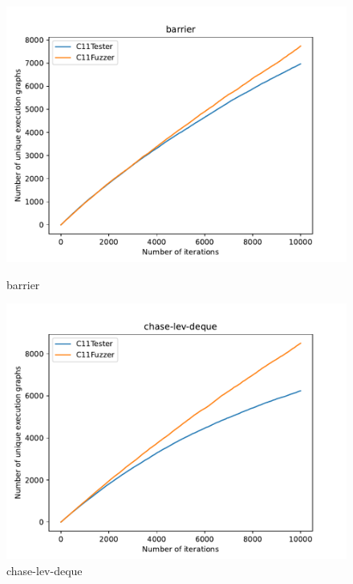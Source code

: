 \begin{figure}[H]

	\centering
	\begin{minipage}{0.45\textwidth}
		\centering
		\includegraphics[width=\textwidth]{figure/barrier.pdf}
		\caption{barrier}
		\label{cover-plot1-barrier}
	\end{minipage}
	\hfill
	\begin{minipage}{0.45\textwidth}
		\centering
		\includegraphics[width=\textwidth]{figure/chase-lev-deque.pdf}
		\caption{chase-lev-deque}
		\label{cover-plot1-chase-lev-deque}
	\end{minipage}

	\vspace{0.5cm}


\end{figure}
